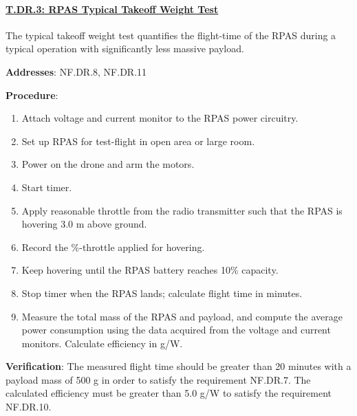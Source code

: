 \paragraph{\underline{T.DR.3: RPAS Typical Takeoff Weight Test}}

The typical takeoff weight test quantifies the flight-time of the RPAS during a typical operation with significantly less massive payload.

\textbf{Addresses}: NF.DR.8, NF.DR.11

\textbf{Procedure}:
\begin{enumerate}[noitemsep]
    \item Attach voltage and current monitor to the RPAS power circuitry.
    \item Set up RPAS for test-flight in open area or large room.
    \item Power on the drone and arm the motors.
    \item Start timer.
    \item Apply reasonable throttle from the radio transmitter such that the RPAS is hovering 3.0 m above ground.
    \item Record the \%-throttle applied for hovering.
    \item Keep hovering until the RPAS battery reaches 10\% capacity.
    \item Stop timer when the RPAS lands; calculate flight time in minutes.
    \item Measure the total mass of the RPAS and payload, and compute the average power consumption using the data acquired from the voltage and current monitors. Calculate efficiency in g/W.
\end{enumerate}

\textbf{Verification}:
The measured flight time should be greater than 20 minutes with a payload mass of 500 g in order to satisfy the requirement NF.DR.7. The calculated efficiency must be greater than 5.0 g/W to satisfy the requirement NF.DR.10.
